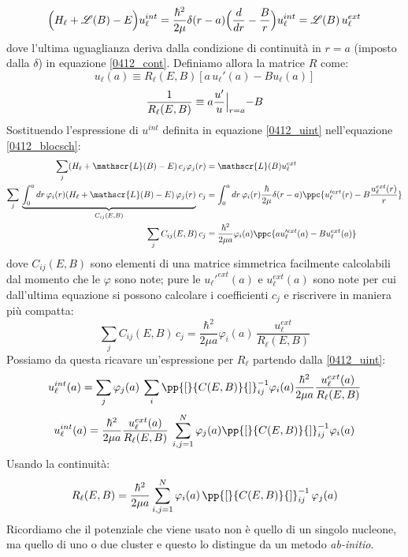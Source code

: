 \begin{equation}\label{0412_blocsch}
\Bigl ( H_\ell + \mathscr{L}(B)-E \Bigr ) u_\ell^{int} = \frac{\hbar^2}{2\mu} \delta(r-a) \Bigl ( \frac{d}{dr} - \frac{B}{r} \Bigr ) u_\ell^{int} = \mathscr{L}(B)\, u_\ell^{ext} 
\end{equation}
dove l'ultima uguaglianza deriva dalla condizione di continuità in $r=a$ (imposto dalla $\delta$) in equazione \eqref{0412_cont}. Definiamo allora la matrice $R$  come:
\begin{equation}\label{0412_Rl}
u_\ell (a) \equiv R_\ell (E,B) [a \, u_\ell ' (a) - B u_\ell (a)]
\end{equation}
$$\frac{1}{R_\ell (E,B)} \equiv a \frac{u'}{u}\Bigl |_{r=a} - B$$
Sostituendo l'espressione di $u^{int}$ definita in equazione \eqref{0412_uint} nell'equazione \eqref{0412_blocsch}:
\begin{displaymath}
	\begin{aligned}
	\sum_j (H_\ell + \mathscr{L}(B)-E) \, c_j \varphi_j(r) &= \mathscr{L}(B) u_\ell^{ext} \\
	\sum_{j} \, \underbrace{\int_0^a dr\, \varphi_i (r) (H_\ell + \mathscr{L}(B)-E) \, \varphi_j(r) }_{C_{ij}(E,B)}\, c_j &= \int_0^a dr \, \varphi_i(r) \frac{\hbar}{2\mu} \delta(r-a) \ppc{u_\ell'^{ext}(r) - B\frac{u^{ext}_\ell (r)}{r}} \\ 
	\sum_j C_{ij}(E,B)\, c_j &= \frac{\hbar^2}{2\mu a} \varphi_i(a) \ppc{a u_\ell '^{ext} (a) - B u_\ell^{ext} (a)} 
	\end{aligned}
\end{displaymath}
dove $C_{ij}(E,B)$ sono elementi di una matrice simmetrica facilmente calcolabili dal momento che le $\varphi$ sono note; pure le $u_\ell '^{ext} (a)$ e $u_\ell^{ext} (a)$ sono note per cui dall'ultima equazione si possono calcolare i coefficienti $c_j$ e riscrivere in maniera più compatta:
\begin{equation}\label{0412_eq9}
\sum_j C_{ij}(E,B) \, c_j = \frac{\hbar^2}{2\mu a} \varphi_i(a)	\, \frac{u_\ell^{ext}}{R_\ell(E,B)}
\end{equation}
Possiamo da questa ricavare un'espressione per $R_\ell$ partendo dalla \eqref{0412_uint}:
$$u_\ell^{int}(a) = \sum_j \varphi_j(a) \: \sum_i  \pp{[}{C(E,B)}{]}_{ij}^{-1} \varphi_i(a) \frac{\hbar^2}{2\mu a} \frac{u_\ell^{ext}(a)}{R_\ell(E,B)}$$
\begin{equation}\label{0412_uint2}
	u_\ell^{int}(a) = \frac{\hbar^2}{2\mu a} \frac{u_\ell^{ext}(a)}{R_\ell(E,B)} \:  \sum_{i,j=1}^N \varphi_j(a) \pp{[}{C(E,B)}{]}_{ij}^{-1} \varphi_i (a)
\end{equation}
Usando la continuità:
\begin{equation}\label{0412_Rl2}
R_\ell(E,B) = \frac{\hbar^2}{2\mu a} \sum_{i,j=1}^N \varphi_i(a)\, \pp{[}{C(E,B)}{]}_{ij}^{-1}\, \varphi_j(a) 
\end{equation}
Ricordiamo che il potenziale che viene usato non è quello di un singolo nucleone, ma quello di uno o due cluster e questo lo distingue da un metodo \textit{ab-initio}.

